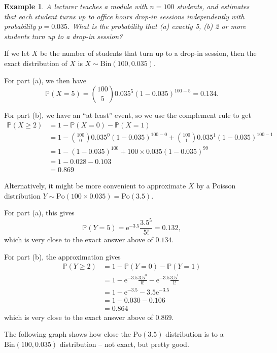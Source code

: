 \documentclass[
  a4paper,
]{book}
\theoremstyle{definition}
\theoremstyle{definition}
\newtheorem{example}{Example}[chapter]
\theoremstyle{definition}
\theoremstyle{definition}
\theoremstyle{remark}
\begin{document}
\begin{example}
\emph{A lecturer teaches a module with \(n = 100\) students, and estimates that each student turns up to office hours drop-in sessions independently with probability \(p = 0.035\). What is the probability that (a) exactly 5, (b) 2 or more students turn up to a drop-in session?}

If we let \(X\) be the number of students that turn up to a drop-in session, then the exact distribution of \(X\) is \(X \sim \text{Bin}(100, 0.035)\).

For part (a), we then have
\[ \mathbb P(X = 5) = \binom{100}{5} 0.035^5 (1 - 0.035)^{100-5} = 0.134 .  \]

For part (b), we have an ``at least'' event, so we use the complement rule to get
\begin{align*}
\mathbb P(X \geq 2)
&= 1 - \mathbb P(X = 0) - \mathbb P(X = 1) \\
&= 1 - \binom{100}{0} 0.035^0 (1 - 0.035)^{100-0} + \binom{100}{1} 0.035^1 (1 - 0.035)^{100 - 1} \\
&= 1 - (1 - 0.035)^{100} + 100 \times 0.035 (1 - 0.035)^{99} \\
&= 1 - 0.028 - 0.103 \\
&= 0.869
\end{align*}

Alternatively, it might be more convenient to approximate \(X\) by a Poisson distribution \(Y \sim \text{Po}(100 \times 0.035) = \text{Po}(3.5)\).

For part (a), this gives
\[ \mathbb P(Y = 5) = \mathrm e^{-3.5} \frac{3.5^5}{5!} = 0.132 ,  \]
which is very close to the exact answer above of \(0.134\).

For part (b), the approximation gives
\begin{align*}
\mathbb P(Y \geq 2)
&= 1 - \mathbb P(Y = 0) - \mathbb P(Y = 1) \\
&= 1 - \mathrm e^{-3.5} \frac{3.5^0}{0!} - \mathrm e^{-3.5} \frac{3.5^1}{1!} \\
&= 1 - \mathrm e^{-3.5} - 3.5 \mathrm e^{-3.5} \\
&= 1 - 0.030 - 0.106 \\
&= 0.864
\end{align*}
which is very close to the exact answer above of \(0.869\).

The following graph shows how close the \(\text{Po}(3.5)\) distribution is to a \(\text{Bin}(100, 0.035)\) distribution -- not exact, but pretty good.


\end{example}
\end{document}
